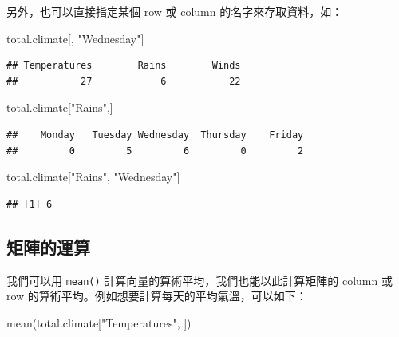 \documentclass[
]{book}
\newenvironment{Shaded}{\begin{snugshade}}{\end{snugshade}}
\newcommand{\FunctionTok}[1]{\textcolor[rgb]{0.00,0.00,0.00}{#1}}
\newcommand{\NormalTok}[1]{#1}
\newcommand{\StringTok}[1]{\textcolor[rgb]{0.31,0.60,0.02}{#1}}
\theoremstyle{definition}
\theoremstyle{remark}
\begin{document}
另外，也可以直接指定某個 row 或 column 的名字來存取資料，如：

\begin{Shaded}
\begin{Highlighting}[]
\NormalTok{total.climate[, }\StringTok{"Wednesday"}\NormalTok{]}
\end{Highlighting}
\end{Shaded}

\begin{verbatim}
## Temperatures        Rains        Winds 
##           27            6           22
\end{verbatim}

\begin{Shaded}
\begin{Highlighting}[]
\NormalTok{total.climate[}\StringTok{"Rains"}\NormalTok{,]}
\end{Highlighting}
\end{Shaded}

\begin{verbatim}
##    Monday   Tuesday Wednesday  Thursday    Friday 
##         0         5         6         0         2
\end{verbatim}

\begin{Shaded}
\begin{Highlighting}[]
\NormalTok{total.climate[}\StringTok{"Rains"}\NormalTok{, }\StringTok{"Wednesday"}\NormalTok{]}
\end{Highlighting}
\end{Shaded}

\begin{verbatim}
## [1] 6
\end{verbatim}

\hypertarget{ux77e9ux9663ux7684ux904bux7b97}{%
\subsection{矩陣的運算}\label{ux77e9ux9663ux7684ux904bux7b97}}

我們可以用 \texttt{mean()} 計算向量的算術平均，我們也能以此計算矩陣的 column 或 row 的算術平均。例如想要計算每天的平均氣溫，可以如下：

\begin{Shaded}
\begin{Highlighting}[]
\FunctionTok{mean}\NormalTok{(total.climate[}\StringTok{"Temperatures"}\NormalTok{, ])}
\end{Highlighting}
\end{Shaded}
\end{document}
